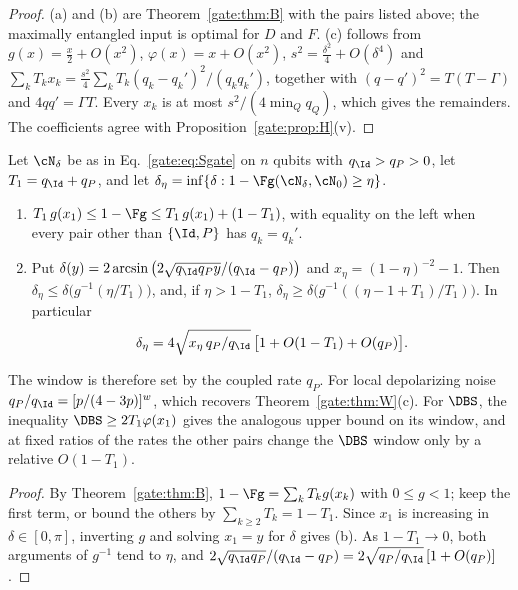 \begin{proof}
(a) and (b) are Theorem~\ref{gate:thm:B} with the pairs listed above; the maximally entangled input is optimal for $D$ and $F$. (c) follows from $g(x)=\frac x2+O(x^2)$, $\varphi(x)=x+O(x^2)$, $s^2=\frac{\delta^2}{4}+O(\delta^4)$ and $\sum_kT_kx_k=\frac{s^2}{4}\sum_kT_k(q_k-q_k')^2/(q_kq_k')$, together with $(q-q')^2=T(T-\Gamma)$ and $4qq'=\Gamma T$. Every $x_k$ is at most $s^2/(4\min_Qq_Q)$, which gives the remainders. The coefficients agree with Proposition~\ref{gate:prop:H}(v).
\end{proof}

\begin{proposition}\label{gate:prop:Bwindow}
Let $\cN_\delta$ be as in Eq.~\eqref{gate:eq:Sgate} on $n$ qubits with $q_\Id>q_P>0$, let $T_1=q_\Id+q_P$, and let $\delta_\eta=\inf\{\delta:1-\Fg(\cN_\delta,\cN_0)\ge\eta\}$.
\begin{enumerate}
\item[(a)] $T_1\,g(x_1)\le1-\Fg\le T_1\,g(x_1)+(1-T_1)$, with equality on the left when every pair other than $\{\Id,P\}$ has $q_k=q_k'$.
\item[(b)] Put $\delta(y)=2\arcsin\big(2\sqrt{q_\Id q_Py}/(q_\Id-q_P)\big)$ and $x_\eta=(1-\eta)^{-2}-1$. Then $\delta_\eta\le\delta\big(g^{-1}(\eta/T_1)\big)$, and, if $\eta>1-T_1$, $\delta_\eta\ge\delta\big(g^{-1}((\eta-1+T_1)/T_1)\big)$. In particular
\begin{equation}\label{gate:eq:Bwindow}
\delta_\eta=4\sqrt{x_\eta\,q_P/q_\Id}\,\big[1+O(1-T_1)+O(q_P)\big].
\end{equation}
\end{enumerate}
The window is therefore set by the coupled rate $q_P$. For local depolarizing noise $q_P/q_\Id=[p/(4-3p)]^w$, which recovers Theorem~\ref{gate:thm:W}(c). For $\DBS$, the inequality $\DBS\ge2T_1\varphi(x_1)$ gives the analogous upper bound on its window, and at fixed ratios of the rates the other pairs change the $\DBS$ window only by a relative $O(1-T_1)$.
\end{proposition}

\begin{proof}
By Theorem~\ref{gate:thm:B}, $1-\Fg=\sum_kT_kg(x_k)$ with $0\le g<1$; keep the first term, or bound the others by $\sum_{k\ge2}T_k=1-T_1$. Since $x_1$ is increasing in $\delta\in[0,\pi]$, inverting $g$ and solving $x_1=y$ for $\delta$ gives (b). As $1-T_1\to0$, both arguments of $g^{-1}$ tend to $\eta$, and $2\sqrt{q_\Id q_P}/(q_\Id-q_P)=2\sqrt{q_P/q_\Id}\,[1+O(q_P)]$.
\end{proof}

